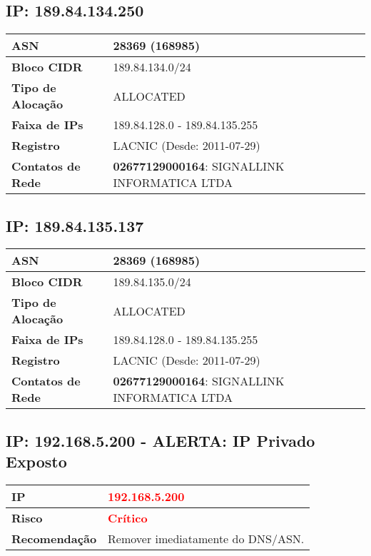     \subsection{IP: 189.84.134.250}
    \begin{tabular}{|l|l|}
    \hline
    \textbf{ASN} & 28369 (168985) \\ \hline
    \textbf{Bloco CIDR} & 189.84.134.0/24 \\ \hline
    \textbf{Tipo de Alocação} & ALLOCATED \\ \hline
    \textbf{Faixa de IPs} & 189.84.128.0 - 189.84.135.255 \\ \hline
    \textbf{Registro} & LACNIC (Desde: 2011-07-29) \\ \hline
        
\textbf{Contatos de Rede} & \textbf{02677129000164}: SIGNALLINK INFORMATICA LTDA 
\\ \hline
\end{tabular}


    \subsection{IP: 189.84.135.137}
    \begin{tabular}{|l|l|}
    \hline
    \textbf{ASN} & 28369 (168985) \\ \hline
    \textbf{Bloco CIDR} & 189.84.135.0/24 \\ \hline
    \textbf{Tipo de Alocação} & ALLOCATED \\ \hline
    \textbf{Faixa de IPs} & 189.84.128.0 - 189.84.135.255 \\ \hline
    \textbf{Registro} & LACNIC (Desde: 2011-07-29) \\ \hline
        
\textbf{Contatos de Rede} & \textbf{02677129000164}: SIGNALLINK INFORMATICA LTDA 
\\ \hline
\end{tabular}


\subsection{IP: 192.168.5.200 - ALERTA: IP Privado Exposto}
\begin{tabular}{|l|l|}
\hline
\textbf{IP} & \textbf{\textcolor{red}{ 192.168.5.200 } } \\ \hline
\textbf{Risco} & \textbf{\textcolor{red}{Crítico}} \\ \hline
\textbf{Recomendação} & Remover imediatamente do DNS/ASN. \\ \hline
\end{tabular}

